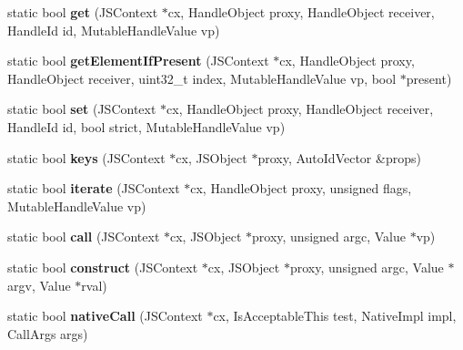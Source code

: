 \begin{DoxyCompactItemize}
\item 
\hypertarget{classjs_1_1_proxy_ad3875c8f47ad412f80c6d3cb56bdd0c7}{static bool {\bfseries get} (J\-S\-Context $\ast$cx, Handle\-Object proxy, Handle\-Object receiver, Handle\-Id id, Mutable\-Handle\-Value vp)}\label{classjs_1_1_proxy_ad3875c8f47ad412f80c6d3cb56bdd0c7}

\item 
\hypertarget{classjs_1_1_proxy_a20a84e34931fab47c2ad2036b9aa5148}{static bool {\bfseries get\-Element\-If\-Present} (J\-S\-Context $\ast$cx, Handle\-Object proxy, Handle\-Object receiver, uint32\-\_\-t index, Mutable\-Handle\-Value vp, bool $\ast$present)}\label{classjs_1_1_proxy_a20a84e34931fab47c2ad2036b9aa5148}

\item 
\hypertarget{classjs_1_1_proxy_a378ba638f51cc1979ccd67085b14f93f}{static bool {\bfseries set} (J\-S\-Context $\ast$cx, Handle\-Object proxy, Handle\-Object receiver, Handle\-Id id, bool strict, Mutable\-Handle\-Value vp)}\label{classjs_1_1_proxy_a378ba638f51cc1979ccd67085b14f93f}

\item 
\hypertarget{classjs_1_1_proxy_a455d3da56c738e76c5f44c34ad7ab3bf}{static bool {\bfseries keys} (J\-S\-Context $\ast$cx, J\-S\-Object $\ast$proxy, Auto\-Id\-Vector \&props)}\label{classjs_1_1_proxy_a455d3da56c738e76c5f44c34ad7ab3bf}

\item 
\hypertarget{classjs_1_1_proxy_a7c45b121f4079b7a84b99c6059100459}{static bool {\bfseries iterate} (J\-S\-Context $\ast$cx, Handle\-Object proxy, unsigned flags, Mutable\-Handle\-Value vp)}\label{classjs_1_1_proxy_a7c45b121f4079b7a84b99c6059100459}

\item 
\hypertarget{classjs_1_1_proxy_a00aacb3ef96a6ec72785b2c514c324a4}{static bool {\bfseries call} (J\-S\-Context $\ast$cx, J\-S\-Object $\ast$proxy, unsigned argc, Value $\ast$vp)}\label{classjs_1_1_proxy_a00aacb3ef96a6ec72785b2c514c324a4}

\item 
\hypertarget{classjs_1_1_proxy_ac5ad0fd9151ab2f382b3f86f6f9ec468}{static bool {\bfseries construct} (J\-S\-Context $\ast$cx, J\-S\-Object $\ast$proxy, unsigned argc, Value $\ast$argv, Value $\ast$rval)}\label{classjs_1_1_proxy_ac5ad0fd9151ab2f382b3f86f6f9ec468}

\item 
\hypertarget{classjs_1_1_proxy_acd31ab689818ddffbc1bbd898f50f4b4}{static bool {\bfseries native\-Call} (J\-S\-Context $\ast$cx, Is\-Acceptable\-This test, Native\-Impl impl, Call\-Args args)}\label{classjs_1_1_proxy_acd31ab689818ddffbc1bbd898f50f4b4}


\end{DoxyCompactItemize}
